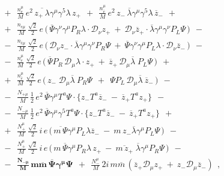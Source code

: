 \documentclass[a4paper,12pt]{article}
\begin{document}
\begin{eqnarray}
\nonumber
&&
	~~+~~
	\frac{n_e^\mu}{M}\, e^2\,
	\overline{z_+ \, \lambda} \gamma^\mu \gamma^5 
	\lambda\, z_+ 
	~~+~~
	\frac{n_{\bar{e}}^\mu}{M}\, e^2\,
	z_-\, \overline{\lambda}\gamma^\mu\gamma^5
	\lambda\, \overline{z}_-
	~~+~~ \\
\nonumber
&&
	~~+~~
	\frac{n_{e\mu}}{M}\,
	\frac{\sqrt{2}}{2}\, e\,
	\Big(\,
		\overline{\Psi} \gamma^\nu\gamma^\mu P_R
		\lambda \cdot \mathcal{D}_\nu z_+ 
		~+~
		\mathcal{D}_\nu \overline{z}_+ \cdot
		\overline{\lambda} \gamma^\mu \gamma^\nu
		P_L \Psi
	\,
	\Big)
	~~-~~ \\
\nonumber
&&
	~~-~~
	\frac{n_{\bar{e}\mu}}{M}\,
	\frac{\sqrt{2}}{2}\,e\,
	\Big(\,
		\mathcal{D}_\nu z_- \cdot
		\overline{\lambda}\gamma^\mu\gamma^\nu P_R \Psi
		~+~
		\overline{\Psi}\gamma^\nu\gamma^\mu P_L \lambda
		\cdot \mathcal{D}_\nu \overline{z}_-
	\,
	\Big)
	~~-~~ \\
\label{LV_matter_component}
&&
	~~-~~
	\frac{n_e^\mu}{M}\,
	\frac{\sqrt{2}}{2}\, e\,
	\Big(\,
		\overline{\Psi}P_R\, \mathcal{D}_\mu \lambda
		\cdot z_+ 
		~+~
		\overline{z}_+ \,
		\mathcal{D}_\mu 
		\overline{\lambda}\; P_L \Psi
	\,\Big)
	~~+~~ \\
\nonumber
&&
	~~+~~
	\frac{n_{\bar{e}}^\mu}{M}\,
	\frac{\sqrt{2}}{2}\, e\,
	\Big(\,
		z_-\; \mathcal{D}_\mu \overline{\lambda} ~
		P_R \Psi 
		~~+~~
		\Psi P_L \, \mathcal{D}_\mu \overline{\lambda} ~
		\overline{z}_-
	\,\Big) 
	~~-~~ \\
\nonumber
&&
	~~-~~ 
	\frac{N_{+\mu}}{M}\,
	\frac{1}{2}\, e^2\,
	\overline{\Psi}\gamma^\mu T^a \Psi \cdot
	\Big\{
	  z_- T^a \overline{z}_- 
	  ~-~
	  \overline{z}_+ T^a z_+
	\Big\}
	~~-~~ \\
\nonumber
&&
	~~-~~
	\frac{N_{-\mu}}{M}\,
	\frac{1}{2}\, e^2\,
	\overline{\Psi}\gamma^\mu \gamma^5 T^a \Psi \cdot
	\Big\{
	  z_- T^a \overline{z}_- 
	  ~-~
	  \overline{z}_+ T^a z_+
	\Big\}
	~~+~~ \\
\nonumber
&&
	~~+~~
	\frac{N_+^\mu}{M}\,
	\frac{\sqrt{2}}{2}\, i\, e\,
	\Big(\,
		\overline{m\, \Psi} \gamma^\mu P_L
		\lambda \overline{z}_- 
		~-~
		m\, z_- \overline{\lambda}
		\gamma^\mu P_L \Psi
	\,\Big)
	~~-~~ \\
\nonumber
&&
	~~-~~
	\frac{N_+^\mu}{M}\,
	\frac{\sqrt{2}}{2}\, i\, e\,
	\Big(\,
		m\, \overline{\Psi}\gamma^\mu P_R \lambda\, z_+ 
		~-~
		\overline{m\, z_+}\; \overline{\lambda}
		\gamma^\mu P_R \Psi
	\,\Big)
	~~-~~ \\
\nonumber
&&
	~~-~~
\mathbf{
	\frac{N_{-\mu}}{M}\,
	m \overline{m} \,
	\overline{\Psi} \gamma^\mu \Psi
    }
	~~+~~ 
	\frac{N_-^\mu}{M}\, 2 i\, m \overline{m}\,
	\left( 
		\overline{z}_+ \mathcal{D}_\mu z_+ 
		~+~
		z_- \mathcal{D}_\mu \overline{z}_-
	\right)
	~~,
\end{eqnarray}
\end{document}
